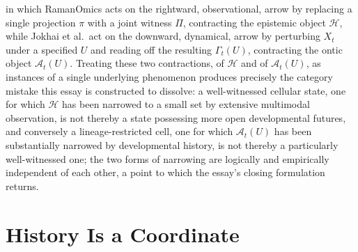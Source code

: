 \documentclass[11pt]{article}
\begin{document}
in which RamanOmics acts on the rightward, observational, arrow by replacing a single projection $\pi$ with a joint witness $\Pi$, contracting the epistemic object $\mathcal{H}$, while Jokhai et al.\ act on the downward, dynamical, arrow by perturbing $X_t$ under a specified $U$ and reading off the resulting $\Gamma_t(U)$, contracting the ontic object $\mathcal{A}_t(U)$. Treating these two contractions, of $\mathcal{H}$ and of $\mathcal{A}_t(U)$, as instances of a single underlying phenomenon produces precisely the category mistake this essay is constructed to dissolve: a well-witnessed cellular state, one for which $\mathcal{H}$ has been narrowed to a small set by extensive multimodal observation, is not thereby a state possessing more open developmental futures, and conversely a lineage-restricted cell, one for which $\mathcal{A}_t(U)$ has been substantially narrowed by developmental history, is not thereby a particularly well-witnessed one; the two forms of narrowing are logically and empirically independent of each other, a point to which the essay's closing formulation returns.

\section{History Is a Coordinate}
\end{document}

